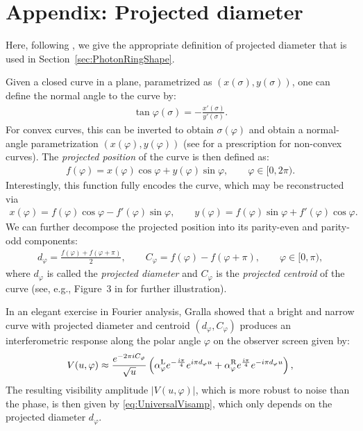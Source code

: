 \documentclass[graybox,envcountchap]{svmult}
\newcommand{\pa}[1]{\left(#1\right)}
\begin{document}
\section*{Appendix: Projected diameter}
\label{app:ProjectedDiameter}

Here, following \cite{GrallaLupsasca2020c}, we give the appropriate definition of projected diameter that is used in Section~\ref{sec:PhotonRingShape}.

Given a closed curve in a plane, parametrized as $(x(\sigma),y(\sigma))$, one can define the normal angle to the curve by:
\begin{align}
    \tan{\varphi(\sigma)}=-\frac{x'(\sigma)}{y'(\sigma)}.
\end{align}
For convex curves, this can be inverted to obtain $\sigma(\varphi)$ and obtain a normal-angle parametrization $(x(\varphi),y(\varphi))$ (see \cite{GrallaLupsasca2020c} for a prescription for non-convex curves).
The \emph{projected position} of the curve is then defined as:
\begin{align}
    f(\varphi)=x(\varphi)\cos{\varphi}+y(\varphi)\sin{\varphi},\qquad
    \varphi\in[0,2\pi).
\end{align}
Interestingly, this function fully encodes the curve, which may be reconstructed via
\begin{align}
    x(\varphi)=f(\varphi)\cos{\varphi}-f'(\varphi)\sin{\varphi},\qquad
    y(\varphi)=f(\varphi)\sin{\varphi}+f'(\varphi)\cos{\varphi}.
\end{align}
We can further decompose the projected position  into its parity-even and parity-odd components:
\begin{align}
    d_\varphi=\frac{f(\varphi)+f(\varphi+\pi)}{2},\qquad
    C_\varphi=f(\varphi)-f(\varphi+\pi),\qquad
    \varphi\in[0,\pi),
\end{align}
where $d_\varphi$ is called the \emph{projected diameter} and $C_\varphi$ is the \emph{projected centroid} of the curve (see, e.g., Figure~3 in \cite{GrallaLupsasca2020c} for further illustration).

In an elegant exercise in Fourier analysis, Gralla \cite{Gralla2020} showed that a bright and narrow curve with projected diameter and centroid $(d_\varphi,C_\varphi)$ produces an interferometric response along the polar angle $\varphi$ on the observer screen given by:
\begin{align}
    V(u,\varphi)\approx\frac{e^{-2\pi iC_\varphi}}{\sqrt{u}}\pa{\alpha_\varphi^{\rm L}e^{-\frac{i\pi}{4}}e^{i\pi d_\varphi u}+\alpha_\varphi^{\rm R}e^{\frac{i\pi}{4}}e^{-i\pi d_\varphi u}},
\end{align}
The resulting visibility amplitude $|V(u,\varphi)|$, which is more robust to noise than the phase, is then given by \eqref{eq:UniversalVisamp}, which only depends on the projected diameter $d_\varphi$.



\end{document}
